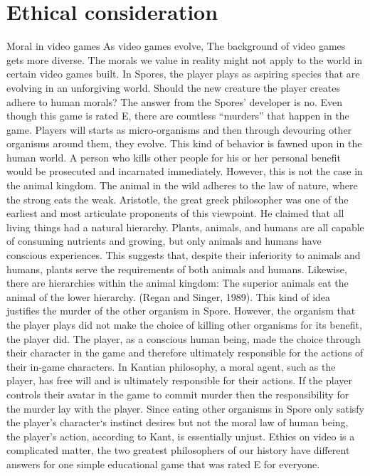 \documentclass[10pt,twocolumn]{article}
\begin{document}
\section{Ethical consideration}
Moral in video games
 As video games evolve, The background of video games gets more diverse. The morals we value in reality might not apply to the world in certain video games built. In Spores, the player plays as aspiring species that are evolving in an unforgiving world. Should the new creature the player creates adhere to human morals? The answer from the Spores’ developer is no. Even though this game is rated E, there are countless “murders” that happen in the game. Players will starts as micro-organisms and then through devouring other organisms around them, they evolve. This kind of behavior is fawned upon in the human world. A person who kills other people for his or her personal benefit would be prosecuted and incarnated immediately. However, this is not the case in the animal kingdom. The animal in the wild adheres to the law of nature, where the strong eats the weak. Aristotle, the great greek philosopher was one of the earliest and most articulate proponents of this viewpoint. He claimed that all living things had a natural hierarchy. Plants, animals, and humans are all capable of consuming nutrients and growing, but only animals and humans have conscious experiences. This suggests that, despite their inferiority to animals and humans, plants serve the requirements of both animals and humans. Likewise, there are hierarchies within the animal kingdom: The superior animals eat the animal of the lower hierarchy. (Regan and Singer, 1989). This kind of idea justifies the murder of the other organism in Spore. However, the organism that the player plays did not make the choice of killing other organisms for its benefit, the player did.
The player, as a conscious human being, made the choice through their character in the game and therefore ultimately responsible for the actions of their in-game characters.  In Kantian philosophy, a moral agent, such as the player, has free will and is ultimately responsible for their actions. If the player controls their avatar in the game to commit murder then the responsibility for the murder lay with the player. Since eating other organisms in Spore only satisfy the player’s character‘s instinct desires but not the moral law of human being, the player’s action, according to Kant, is essentially unjust.
Ethics on video is a complicated matter, the two greatest philosophers of our history have different answers for one simple educational game that was rated E for everyone. 
\end{document}
